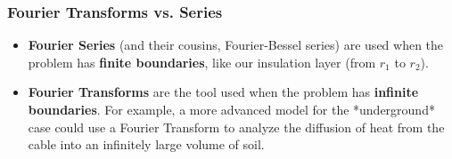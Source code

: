 \documentclass[11pt, a4paper]{article}
\begin{document}
\subsubsection{Fourier Transforms vs. Series}
\begin{itemize}
    \item \textbf{Fourier Series} (and their cousins, Fourier-Bessel series) are used when the problem has \textbf{finite boundaries}, like our insulation layer (from $r_1$ to $r_2$).
    \item \textbf{Fourier Transforms} are the tool used when the problem has \textbf{infinite boundaries}. For example, a more advanced model for the *underground* case could use a Fourier Transform to analyze the diffusion of heat from the cable into an infinitely large volume of soil.
\end{itemize}
\end{document}
